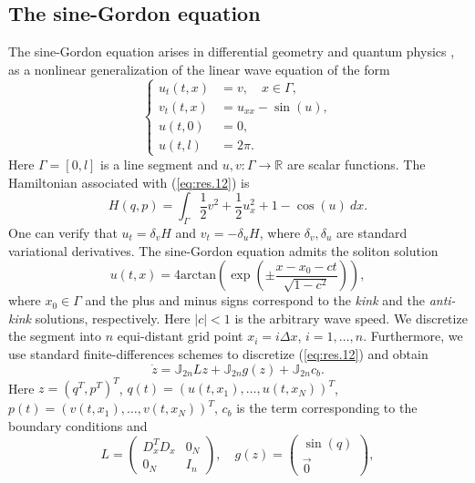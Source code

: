 \subsection{The sine-Gordon equation} \label{sec:res.2}
The sine-Gordon equation arises in differential geometry and quantum physics \cite{Misumi2015}, as a nonlinear generalization of the linear wave equation of the form
\begin{equation} \label{eq:res.12}
\left\{
\begin{aligned}
	u_{t}(t,x) &= v, \quad x\in \Gamma,\\
	v_t(t,x) &= u_{xx} - \sin(u), \\
	u(t,0) &= 0, \\
	u(t,l) &= 2\pi.
\end{aligned}
\right.
\end{equation}
Here $\Gamma = [0,l]$ is a line segment and $u,v: \Gamma \to \mathbb R$ are scalar functions. The Hamiltonian associated with (\ref{eq:res.12}) is
\begin{equation} \label{eq:res.13}
	H(q,p) = \int_{\Gamma} \frac 1 2 v^2 + \frac 1 2 u_x^2 + 1 - \cos(u) \ dx.
\end{equation}
One can verify that $u_{t} = \delta_v H$ and $v_{t} = - \delta_u H$, where $\delta_v,\delta_u$ are standard variational derivatives. The sine-Gordon equation admits the soliton solution
\begin{equation} \label{eq:res.14}
	u(t,x) = 4 \text{arctan}\left( \exp \left( \pm \frac{x - x_0 - ct}{\sqrt{1-c^2}} \right) \right),
\end{equation}
where $x_0 \in \Gamma$ and the plus and minus signs correspond to the \emph{kink} and the \emph{anti-kink} solutions, respectively. Here $|c|<1$ is the arbitrary wave speed. We discretize the segment into $n$ equi-distant grid point $x_i = i\Delta x$, $i=1,\dots,n$. Furthermore, we use standard finite-differences schemes to discretize (\ref{eq:res.12}) and obtain
\begin{equation} \label{eq:res.15}
	\dot z = \mathbb J_{2n} L z + \mathbb J_{2n} g(z) + \mathbb J_{2n} c_b.
\end{equation}
Here $z = (q^T,p^T)^T$, $q(t) = (u(t,x_1),\dots,u(t,x_N))^T$, $p(t) = (v(t,x_1),\dots,v(t,x_N))^T$, $c_b$ is the term corresponding to the boundary conditions and
\begin{equation} \label{eq:res.16}
	L = 
	\begin{pmatrix}
		D_x^TD_x & 0_N \\
		0_N & I_n
	\end{pmatrix}, 
	\quad
	g(z) = 
	\begin{pmatrix}
	\sin(q) \\
	\vec 0
	\end{pmatrix},
\end{equation}
